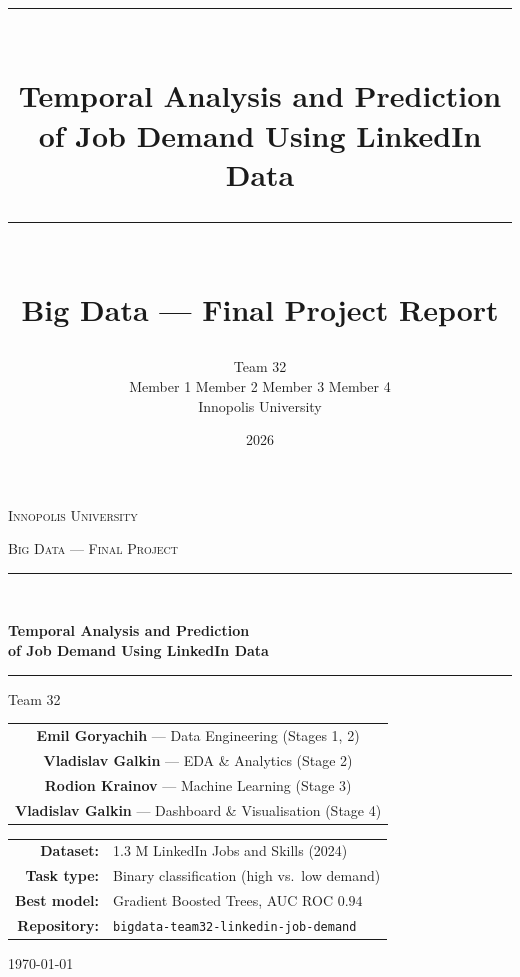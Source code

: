 \documentclass[11pt,a4paper]{article}
\title{
  \vspace{-1cm}
  \rule{\linewidth}{0.4pt}\\[6pt]
  {\Huge\bfseries Temporal Analysis and Prediction\\of Job Demand Using LinkedIn Data}\\[8pt]
  \rule{\linewidth}{0.4pt}\\
  \large Big Data --- Final Project Report
}
\author{
  Team 32 \\[2pt]
  \small
  Member 1 \quad Member 2 \quad Member 3 \quad Member 4 \\[6pt]
  Innopolis University
}
\date{2026}
\begin{document}
\begin{titlepage}
\centering
\vspace*{1cm}

{\scshape\Large Innopolis University \par}
\vspace{0.3cm}
{\scshape\large Big Data --- Final Project \par}

\vspace{2.5cm}
\rule{\linewidth}{0.6pt}\\[12pt]
{\Huge\bfseries Temporal Analysis and Prediction\\[4pt]of Job Demand Using LinkedIn Data\par}
\vspace{12pt}
\rule{\linewidth}{0.6pt}

\vspace{2cm}
{\Large Team 32\par}
\vspace{0.6cm}

\begin{tabular}{c}
\textbf{Emil Goryachih} --- Data Engineering (Stages 1, 2)\\[4pt]
\textbf{Vladislav Galkin} --- EDA \& Analytics (Stage 2)\\[4pt]
\textbf{Rodion Krainov} --- Machine Learning (Stage 3)\\[4pt]
\textbf{Vladislav Galkin} --- Dashboard \& Visualisation (Stage 4)\\
\end{tabular}

\vfill

\begin{tabular}{rl}
\textbf{Dataset:} & 1.3 M LinkedIn Jobs and Skills (2024) \\
\textbf{Task type:} & Binary classification (high vs.\ low demand) \\
\textbf{Best model:} & Gradient Boosted Trees, AUC ROC $0.94$ \\
\textbf{Repository:} & \texttt{bigdata-team32-linkedin-job-demand} \\
\end{tabular}

\vspace{1.5cm}
{\large \today\par}
\end{titlepage}

\tableofcontents
\newpage
\end{document}

